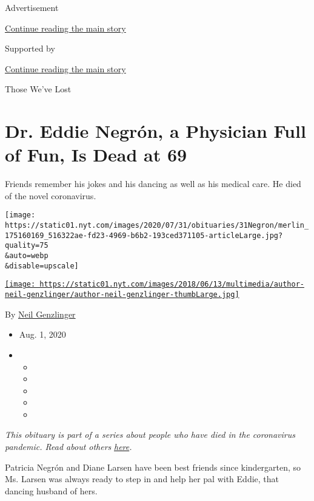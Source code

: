 Advertisement

\protect\hyperlink{after-top}{Continue reading the main story}

Supported by

\protect\hyperlink{after-sponsor}{Continue reading the main story}

Those We've Lost

\hypertarget{dr-eddie-negruxf3n-a-physician-full-of-fun-is-dead-at-69}{%
\section{Dr. Eddie Negrón, a Physician Full of Fun, Is Dead at
69}\label{dr-eddie-negruxf3n-a-physician-full-of-fun-is-dead-at-69}}

Friends remember his jokes and his dancing as well as his medical care.
He died of the novel coronavirus.

\texttt{[image: https://static01.nyt.com/images/2020/07/31/obituaries/31Negron/merlin\_175160169\_516322ae-fd23-4969-b6b2-193ced371105-articleLarge.jpg?quality=75\\\&auto=webp\\\&disable=upscale]}

\href{https://www.nytimes.com/by/neil-genzlinger}{\texttt{[image: https://static01.nyt.com/images/2018/06/13/multimedia/author-neil-genzlinger/author-neil-genzlinger-thumbLarge.jpg]}}

By \href{https://www.nytimes.com/by/neil-genzlinger}{Neil Genzlinger}

\begin{itemize}
\item
  Aug. 1, 2020
\item
  \begin{itemize}
  \item
  \item
  \item
  \item
  \item
  \end{itemize}
\end{itemize}

\emph{This obituary is part of a series about people who have died in
the coronavirus pandemic. Read about others}
\href{https://www.nytimes.com/interactive/2020/obituaries/people-died-coronavirus-obituaries.html}{\emph{here}}\emph{.}

Patricia Negrón and Diane Larsen have been best friends since
kindergarten, so Ms. Larsen was always ready to step in and help her pal
with Eddie, that dancing husband of hers.


